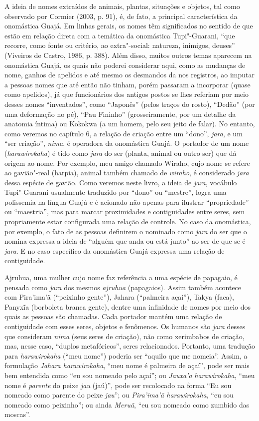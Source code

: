 A ideia de nomes extraídos de animais, plantas, situações e objetos, tal
como observado por Cormier (2003, p. 91), é, de fato, a principal
característica da onomástica Guajá. Em linhas gerais, os nomes têm
significados no sentido de que estão em relação direta com a temática da
onomástica Tupi"-Guarani, ``que recorre, como fonte ou critério, ao
extra"-social: natureza, inimigos, deuses'' (Viveiros de Castro, 1986, p.
388). Além disso, muitos outros temas aparecem na onomástica Guajá, os
quais não poderei considerar aqui, como as mudanças de nome, ganhos de
apelidos e até mesmo os desmandos da  nos registros, ao imputar a
pessoas nomes que até então não tinham, porém passaram a incorporar
(quase como apelidos), já que funcionários dos antigos postos se lhes
referiam por meio desses nomes ``inventados'', como ``Japonês'' (pelos
traços do rosto), ``Dedão'' (por uma deformação no pé), ``Pau Fininho''
(grosseiramente, por um detalhe da anatomia íntima) ou Kokokwa (a um
homem, pelo seu jeito de falar). No entanto, como veremos no capítulo 6,
a relação de criação entre um ``dono'', \emph{jara}, e um ``ser
criação'', \emph{nima}, é operadora da onomástica Guajá. O portador de
um nome (\emph{harawirokaha}) é tido como \emph{jara} do ser (planta,
animal ou outro ser) que dá origem ao nome. Por exemplo, meu amigo
chamado Wiraho, cujo nome se refere ao gavião"-real (harpia), animal
também chamado de \emph{wiraho}, é considerado \emph{jara} dessa espécie
de gavião. Como veremos neste livro, a ideia de \emph{jara}, vocábulo
Tupi"-Guarani usualmente traduzido por ``dono'' ou ``mestre'', logra uma
polissemia na língua Guajá e é acionado não apenas para ilustrar
``propriedade'' ou ``maestria'', mas para marcar proximidades e
contiguidades entre seres, sem propriamente estar configurada uma
relação de controle. No caso da onomástica, por exemplo, o fato de as
pessoas definirem o nominado como \emph{jara} do ser que o nomina
expressa a ideia de ``alguém que anda ou está junto'' ao ser de que se é
\emph{jara}. E no caso específico da onomástica Guajá expressa uma
relação de contiguidade.

Ajruhua, uma mulher cujo nome faz referência a uma espécie de papagaio,
é pensada como \emph{jara} dos mesmos \emph{ajruhua} (papagaios). Assim
também acontece com Pira'ima'ã (``peixinho gente''), Jahara (``palmeira
açaí''), Takya (faca), Panyxĩa (borboleta branca gente), dentre uma
infinidade de nomes por meio dos quais as pessoas são chamadas. Cada
portador mantém uma relação de contiguidade com esses seres, objetos e
fenômenos. Os humanos são \emph{jara} desses que consideram \emph{nima}
(seus seres de criação), não como xerimbabos de criação, mas, nesse
caso, ``duplos metafóricos'', seres relacionados. Portanto, uma tradução
para \emph{harawirokaha} (``meu nome'') poderia ser ``aquilo que me
nomeia''. Assim, a formulação \emph{Jahara harawirokaha}, ``meu nome é
palmeira de açaí'', pode ser mais bem entendida como ``eu sou nomeado
pelo açaí''; ou \emph{Jauxa'a} \emph{harawirokaha}, ``meu nome é
\emph{parente} do peixe \emph{jau} (jaú)'', pode ser recolocado na forma
``Eu sou nomeado como parente do peixe \emph{jau}''; ou \emph{Pira'ima'ã
harawirokaha}, ``eu sou nomeado como peixinho''; ou ainda \emph{Meruã},
``eu sou nomeado como zumbido das moscas''.

